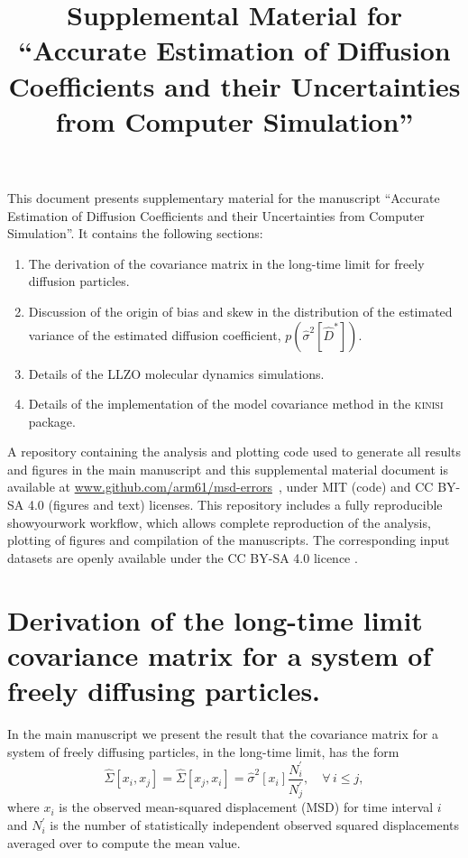 \documentclass[reprint,superscriptaddress,nobibnotes,amsmath,amssymb,aps,prx,hidelinks,linenumbers]{revtex4-2}
\makeatletter
\newcommand{\papertitle}{Accurate Estimation of Diffusion Coefficients and their Uncertainties from Computer Simulation}
\newcommand{\oMSDi}{\ensuremath{x_i}}
\newcommand{\oMSDj}{\ensuremath{x_j}}
\newcommand{\prob}[1]{\ensuremath{p(#1)}}
\newcommand{\nind}[1]{\ensuremath{N^\prime_{#1}}}
\newcommand{\code}[1]{#1}
\newcommand{\Dest}{\ensuremath{\widehat{D}^*}}
\newcommand{\varest}[1]{\ensuremath{\widehat{\sigma}^2[#1]}}
\def\maketitle{
\@author@finish
\title@column\titleblock@produce
\suppressfloats[t]}
\makeatother
\begin{document}
\title{Supplemental Material for ``\papertitle''}
\maketitle

This document presents supplementary material for the manuscript ``\papertitle''.
It contains the following sections:
\begin{enumerate}
    \item The derivation of the covariance matrix in the long-time limit for freely diffusion particles.
    \item Discussion of the origin of bias and skew in the distribution of the estimated variance of the estimated diffusion coefficient, $\prob{\varest{\Dest}}$.
    \item Details of the LLZO molecular dynamics simulations.
    \item Details of the implementation of the model covariance method in the \textsc{kinisi} package.
\end{enumerate}
A repository containing the analysis and plotting code used to generate all results and figures in the main manuscript and this supplemental material document is available at \url{www.github.com/arm61/msd-errors}~\cite{mccluskey_github_2022}, under MIT (code) and CC BY-SA 4.0 (figures and text) licenses.
This repository includes a fully reproducible \code{showyourwork} workflow, which allows complete reproduction of the analysis, plotting of figures and compilation of the manuscripts.
The corresponding input datasets are openly available under the CC BY-SA 4.0 licence \cite{mccluskey_zenodo_2022,coles_llzo_zenodo_2022}. 

\twocolumngrid

\section{Derivation of the long-time limit covariance matrix for a system of freely diffusing particles.}
\label{sec:ran}
In the main manuscript we present the result that the covariance matrix for a system of freely diffusing particles, in the long-time limit, has the form
\begin{equation}
  \widehat{\Sigma}\left[\oMSDi, \oMSDj\right]= \widehat{\Sigma}\left[\oMSDj, \oMSDi\right] =
  \varest{\oMSDi} \frac{\nind{i}}{\nind{j}},\hspace{1em} \forall\,i \leq j,
  \label{equ:cvv_SI}
\end{equation}
where $\oMSDi$ is the observed mean-squared displacement (MSD) for time interval $i$ and $\nind{i}$ is the number of statistically independent observed squared displacements averaged over to compute the mean value.
\end{document}
